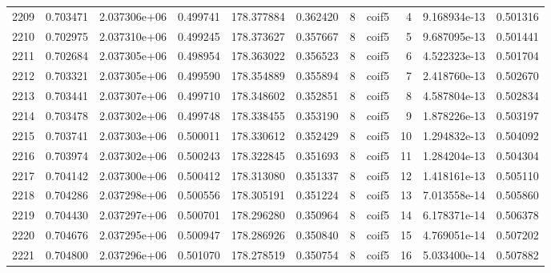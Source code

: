 \begin{tabular}{lrrrrrrlrrr}
2209 &    0.703471 &        2.037306e+06 &  0.499741 &              178.377884 &    0.362420 &       8 &        coif5 &      4 &   9.168934e-13 &      0.501316 \\
2210 &    0.702975 &        2.037310e+06 &  0.499245 &              178.373627 &    0.357667 &       8 &        coif5 &      5 &   9.687095e-13 &      0.501441 \\
2211 &    0.702684 &        2.037305e+06 &  0.498954 &              178.363022 &    0.356523 &       8 &        coif5 &      6 &   4.522323e-13 &      0.501704 \\
2212 &    0.703321 &        2.037305e+06 &  0.499590 &              178.354889 &    0.355894 &       8 &        coif5 &      7 &   2.418760e-13 &      0.502670 \\
2213 &    0.703441 &        2.037307e+06 &  0.499710 &              178.348602 &    0.352851 &       8 &        coif5 &      8 &   4.587804e-13 &      0.502834 \\
2214 &    0.703478 &        2.037302e+06 &  0.499748 &              178.338455 &    0.353190 &       8 &        coif5 &      9 &   1.878226e-13 &      0.503197 \\
2215 &    0.703741 &        2.037303e+06 &  0.500011 &              178.330612 &    0.352429 &       8 &        coif5 &     10 &   1.294832e-13 &      0.504092 \\
2216 &    0.703974 &        2.037302e+06 &  0.500243 &              178.322845 &    0.351693 &       8 &        coif5 &     11 &   1.284204e-13 &      0.504304 \\
2217 &    0.704142 &        2.037300e+06 &  0.500412 &              178.313080 &    0.351337 &       8 &        coif5 &     12 &   1.418161e-13 &      0.505110 \\
2218 &    0.704286 &        2.037298e+06 &  0.500556 &              178.305191 &    0.351224 &       8 &        coif5 &     13 &   7.013558e-14 &      0.505860 \\
2219 &    0.704430 &        2.037297e+06 &  0.500701 &              178.296280 &    0.350964 &       8 &        coif5 &     14 &   6.178371e-14 &      0.506378 \\
2220 &    0.704676 &        2.037295e+06 &  0.500947 &              178.286926 &    0.350840 &       8 &        coif5 &     15 &   4.769051e-14 &      0.507202 \\
2221 &    0.704800 &        2.037296e+06 &  0.501070 &              178.278519 &    0.350754 &       8 &        coif5 &     16 &   5.033400e-14 &      0.507882 \\

\end{tabular}
